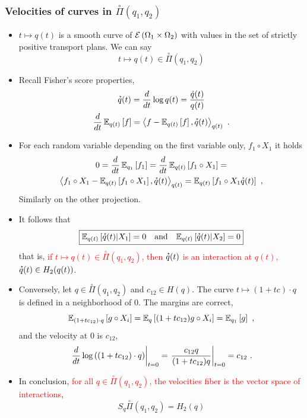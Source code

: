 \documentclass[xcolor=svgnames]{beamer}
\newcommand{\condexpectat}[3]{{\Expectation}_{#1}\left[#2 \middle| #3\right]}
\newcommand{\openplan}[2]{\overset{\circ}\Pi\left(#1,#2\right)}
\newcommand{\rosso}[1]{\textcolor{red}{#1}}
\renewcommand{\emph}{\rosso}
\begin{document}
\begin{frame}\small\frametitle{Velocities of curves in $\overset{\circ}\Pi(q_1,q_2)$}

\begin{itemize}
    \item $t \mapsto q(t)$ is a smooth curve of $\maxexpat {\Omega_1 \times \Omega_2}$ with values in the set of strictly positive transport plans. We can say
    \begin{equation*}
      t \mapsto q(t) \in \overset{\circ}{\Pi}(q_1,q_2)
    \end{equation*}
    \item Recall Fisher's score properties,
    \begin{gather*}
        \velocity q(t) = \derivby t \log q(t) = \frac {\dot q(t)}{q(t)} \\
        \derivby t \expectat {q(t)} f = \scalarat {q(t)} {f - \expectat {q(t)} f}{\velocity q(t)} \ . 
    \end{gather*}
    \item For each random variable depending on the first variable only, $f_1\circ X_1$ it holds
\begin{multline*} 0 = \derivby t \expectat {q_1} {f_1} =  \derivby t \expectat {q(t)} {f_1\circ X_1} = \\ \scalarat {q(t)}  {f_1 \circ X_1 - \expectat {q(t)} {f_1\circ X_1}} {\velocity q(t)} = \expectat {q(t)} {f_1\circ X_1 \velocity q(t)} \ , \end{multline*}  Similarly on the other projection.
\item It follows that
\begin{equation*}
\boxed{\condexpectat {q(t)} {\velocity q(t)} {X_1} = 0 \quad \text{and} \quad \condexpectat {q(t)} {\velocity q(t)} {X_2} = 0}
\end{equation*}
that is, \emph{if $t \mapsto q(t) \in \openplan{q_1}{q_2}$, then $\velocity q(t)$ is an interaction at $q(t)$, $\velocity q(t) \in H_2(q(t))$}.
\item Conversely, let $q \in \openplan{q_1}{q_2}$ and $c_{12} \in H(q)$. The curve $t \mapsto (1+tc) \cdot q$ is defined in a neighborhood of 0. The margins are correct,
\begin{equation*}
    \expectat {(1+tc_{12}) \cdot q}{g\circ X_i} = \expectat q {(1+tc_{12})g\circ X_i} = \expectat {q_1} g \ ,
\end{equation*}
and the velocity at 0 is $c_{12}$,
\begin{equation*}
   \left. \derivby t \logof{(1+tc_{12}) \cdot q}
\right|_{t=0} = \left. \frac {c_{12} q}{(1+tc_{12})q} \right|_{t=0} = c_{12} \ .
\end{equation*}
\item In conclusion, \emph{for all $q \in \overset{\circ}{\Pi}(q_1,q_2)$, the velocities fiber is the vector space of interactions},
\begin{equation*}
 \boxed{S_q \overset{\circ}\Pi(q_1,q_2) = H_2(q)}
\end{equation*}


\end{itemize}
\end{frame}
\end{document}
